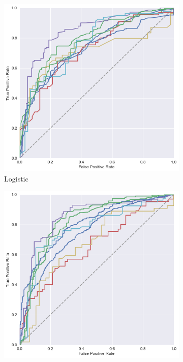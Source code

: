 \documentclass[11pt]{article}
\begin{document}
\begin{figure}[ht]
  \caption{Receiver Operating Characteristic Curves - Price Increase vs. Decrease}
  \begin{subfigure}[b]{0.5\textwidth}
    \includegraphics[width=\textwidth]{logistic_roc.png}
    \caption{Logistic}
  \end{subfigure}
  \begin{subfigure}[b]{0.5\textwidth}
    \includegraphics[width=\textwidth]{ridge_roc.png}

\end{subfigure}
\end{figure}
\end{document}
